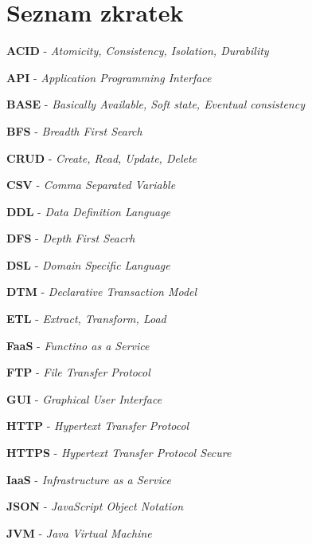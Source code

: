 \documentclass[11pt,twoside,a4paper]{book}
\begin{document}










{
\def\CS{$\cal C\kern-0.1667em\lower.5ex\hbox{$\cal S$}\kern-0.075em $}

}

\appendix

\chapter{Seznam zkratek}
\printnomenclature
\label{apx:zkratky}

\textbf{ACID} - \textit{Atomicity, Consistency, Isolation, Durability}

\textbf{API} - \textit{Application Programming Interface}

\textbf{BASE} - \textit{Basically Available, Soft state, Eventual consistency}

\textbf{BFS} - \textit{Breadth First Search}

\textbf{CRUD} - \textit{Create, Read, Update, Delete}

\textbf{CSV} - \textit{Comma Separated Variable}

\textbf{DDL} - \textit{Data Definition Language}

\textbf{DFS} - \textit{Depth First Seacrh}

\textbf{DSL} - \textit{Domain Specific Language}

\textbf{DTM} - \textit{Declarative Transaction Model}

\textbf{ETL} - \textit{Extract, Transform, Load}

\textbf{FaaS} - \textit{Functino as a Service}

\textbf{FTP} - \textit{File Transfer Protocol}

\textbf{GUI} - \textit{Graphical User Interface}

\textbf{HTTP} - \textit{Hypertext Transfer Protocol}

\textbf{HTTPS} - \textit{Hypertext Transfer Protocol Secure}

\textbf{IaaS} - \textit{Infrastructure as a Service}

\textbf{JSON} - \textit{JavaScript Object Notation}

\textbf{JVM} - \textit{Java Virtual Machine}
\end{document}
